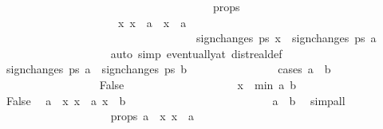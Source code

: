 \begin{isabellebody}
\ \ \ \ \ \ \ \ \ \ \ \ \ \ \ \ \ \ \isamarkupfalse%
\isanewline
\ \ \ \ \ \ \ \ \ \ \ \ \ \ \isamarkupfalse%
\ \isamarkupfalse%
\ {\isasymdelta}\ \ {\isasymdelta}{\isacharunderscore}props{\isacharcolon}\isanewline
\ \ \ \ \ \ \ \ \ \ \ \ \ \ \ \ \ \ {\isachardoublequoteopen}{\isasymdelta}\ {\isachargreater}\ {}{\isachardoublequoteclose}\ {\isachardoublequoteopen}{\isasymforall}x{\isachardot}\ x\ {\isachargreater}\ a\ {\isasymand}\ x\ {\isacharless}\ a{\isacharplus}{\isasymdelta}\ {\isasymlongrightarrow}\ \isanewline
\ \ \ \ \ \ \ \ \ \ \ \ \ \ \ \ \ \ \ \ \ \ \ \ \ \ \ \ \ \ \ \ \ \ \ sign{\isacharunderscore}changes\ ps\ x\ {\isacharequal}\ sign{\isacharunderscore}changes\ ps\ a{\isachardoublequoteclose}\isanewline
\ \ \ \ \ \ \ \ \ \ \ \ \ \ \ \ \ \ \isamarkupfalse%
\ {\isacharparenleft}auto\ simp{\isacharcolon}\ eventually{\isacharunderscore}at\ dist{\isacharunderscore}real{\isacharunderscore}def{\isacharparenright}\isanewline
\isanewline
\ \ \ \ \ \ \ \ \ \ \ \ \ \ \isamarkupfalse%
\ {\isachardoublequoteopen}sign{\isacharunderscore}changes\ ps\ a\ {\isacharequal}\ sign{\isacharunderscore}changes\ ps\ b{\isachardoublequoteclose}\isanewline
\ \ \ \ \ \ \ \ \ \ \ \ \ \ \isamarkupfalse%
\ {\isacharparenleft}cases\ {\isachardoublequoteopen}a\ {\isacharequal}\ b{\isachardoublequoteclose}{\isacharparenright}\isanewline
\ \ \ \ \ \ \ \ \ \ \ \ \ \ \ \ \isamarkupfalse%
\ False\isanewline
\ \ \ \ \ \ \ \ \ \ \ \ \ \ \ \ \ \ \isamarkupfalse%
\ x\ {\isasymequiv}\ {\isachardoublequoteopen}min\ {\isacharparenleft}a{\isacharplus}{\isasymdelta}{\isacharslash}{}{\isacharparenright}\ b{\isachardoublequoteclose}\isanewline
\ \ \ \ \ \ \ \ \ \ \ \ \ \ \ \ \ \ \isamarkupfalse%
\ False\ \isamarkupfalse%
\ {\isachardoublequoteopen}a\ {\isacharless}\ x{\isachardoublequoteclose}\ {\isachardoublequoteopen}x\ {\isacharless}\ a{\isacharplus}{\isasymdelta}{\isachardoublequoteclose}\ {\isachardoublequoteopen}x\ {\isasymle}\ b{\isachardoublequoteclose}\isanewline
\ \ \ \ \ \ \ \ \ \ \ \ \ \ \ \ \ \ \ \ \ \isamarkupfalse%
\ {\isacharbackquoteopen}{\isasymdelta}\ {\isachargreater}\ {}{\isacharbackquoteclose}\ {\isacharbackquoteopen}a\ {\isasymle}\ b{\isacharbackquoteclose}\ \isamarkupfalse%
\ simp{\isacharunderscore}all\isanewline
\ \ \ \ \ \ \ \ \ \ \ \ \ \ \ \ \ \ \isamarkupfalse%
\ {\isasymdelta}{\isacharunderscore}props\ {\isacharbackquoteopen}a\ {\isacharless}\ x{\isacharbackquoteclose}\ {\isacharbackquoteopen}x\ {\isacharless}\ a{\isacharplus}{\isasymdelta}{\isacharbackquoteclose}\ \isanewline

\end{isabellebody}
